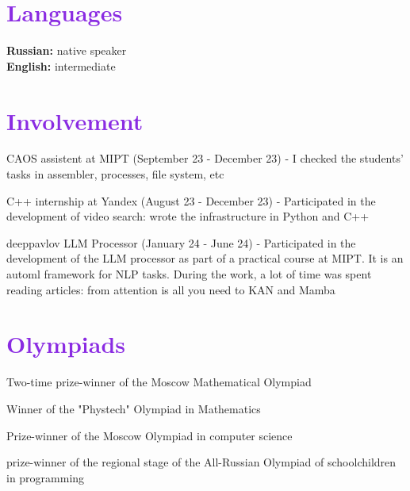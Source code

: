 \documentclass[letterpaper,11pt]{article}
\begin{document}
\section{\textcolor{BlueViolet}{Languages}}
 \begin{itemize}[leftmargin=0.15in, label={}]
    \small{\item{
        \textbf{Russian:}{ native speaker} \\
        \textbf{English:}{ intermediate} \\
    }}
 \end{itemize}
 \vspace{-16pt}

\section{\textcolor{BlueViolet}{Involvement}}
 \begin{itemize}[leftmargin=0.15in]
    {\item{
        { CAOS assistent at MIPT (September 23 - December 23) - I checked the students' tasks in assembler, processes, file system, etc} \\
    }}
    {\item{
        { C++ internship at Yandex (August 23 - December 23) - Participated in the development of video search: wrote the infrastructure in Python and C++}
    }}
    {\item{
        { deeppavlov LLM Processor (January 24 - June 24) - Participated in the development of the LLM processor as part of a practical course at MIPT. It is an automl framework for NLP tasks. During the work, a lot of time was spent reading articles: from attention is all you need to KAN and Mamba}
    }}
 \end{itemize}
 \vspace{-16pt}

\section{\textcolor{BlueViolet}{Olympiads}}
 \begin{itemize}[leftmargin=0.15in]
    {\item{
        { Two-time prize-winner of the Moscow Mathematical Olympiad} \\
    }}
    {\item{
        { Winner of the "Phystech" Olympiad in Mathematics } \\
    }}
    {\item{
        { Prize-winner of the Moscow Olympiad in computer science } \\
    }}
    {\item{
        { prize-winner of the regional stage of the All-Russian Olympiad of schoolchildren in programming } \\
    }}
 \end{itemize}
 \vspace{-16pt}
\end{document}
